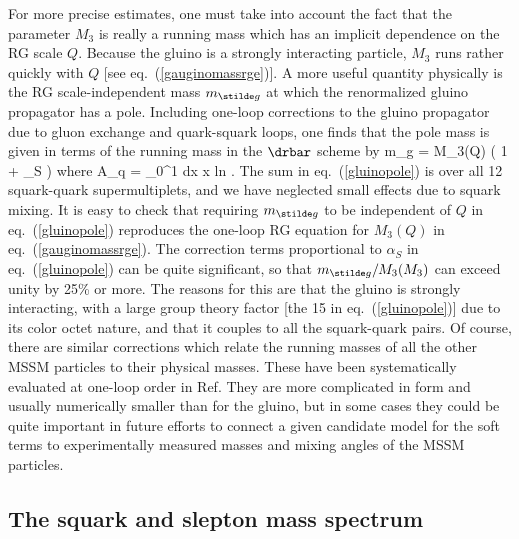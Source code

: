 For more precise estimates, one must take into account the
fact that
the parameter $M_3$ is really a running mass which has an implicit
dependence on the RG scale $Q$.
Because the gluino is a strongly interacting particle,
$M_3$ runs rather quickly with $Q$ [see eq.~(\ref{gauginomassrge})].
A more
useful
quantity
physically is the RG scale-independent mass $m_{\stilde g}$ at which the
renormalized gluino propagator has a pole. Including one-loop
corrections to the gluino propagator due to
gluon exchange and quark-squark loops,
one finds that
the pole mass is given in terms of the running mass
in the $\drbar$ scheme by \cite{gluinopolemass}
\beq
m_{\stilde g} = M_3(Q) \Bigl ( 1 + {\alpha_S \pi}
 \Bigr )
\label{gluinopole}
\eeq
where
\beq
A_{\stilde q} =
\int_0^1 \> dx \> x \> {\rm ln}
.
\eeq
The sum in eq.~(\ref{gluinopole})
is over all 12 squark-quark
supermultiplets, and we have neglected
small effects due to squark mixing.
It is easy to check that requiring $m_{\stilde g}$ to be independent
of $Q$
in eq.~(\ref{gluinopole}) reproduces the one-loop RG equation for $M_3(Q)$
in eq.~(\ref{gauginomassrge}).
The correction terms proportional to $\alpha_S$ in eq.~(\ref{gluinopole})
can be quite significant, so that $m_{\stilde g}/M_3(M_3)$ can exceed
unity by 25\% or more. The reasons for this are that the gluino is strongly
interacting, with a large group theory factor [the 15 in
eq.~(\ref{gluinopole})] due to its color octet nature, and that
it couples to all the squark-quark pairs.
Of course, there are similar
corrections which relate the running masses of all the other
MSSM particles to their physical masses. These
have been systematically evaluated at one-loop order in Ref.\cite{PBMZ}
They are more complicated in form and usually numerically
smaller than for the gluino, but in some cases they
could be quite
important in future efforts to connect a given candidate model for
the soft terms to experimentally measured
masses and mixing angles of the MSSM particles.

\subsection{The squark and slepton mass
spectrum}\label{subsec:MSSMspectrum.sfermions}

